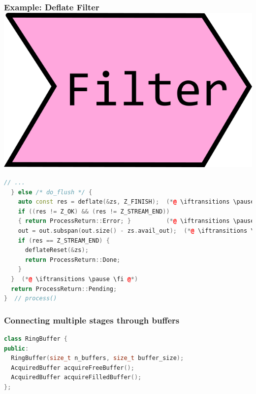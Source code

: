 \documentclass[aspectratio=169]{beamer}
\newif\iftransitions
\begin{document}
\begin{frame}[fragile]
  \frametitle{Example: Deflate Filter \hspace{233pt} \includegraphics[height=.1\textheight]{pipelinesgfx/filter.png}}
  
  \begin{lstlisting}[language={C++}]
  // ...
  } else /* do_flush */ {
    auto const res = deflate(&zs, Z_FINISH);  (*@ \iftransitions \pause \fi @*)
    if ((res != Z_OK) && (res != Z_STREAM_END))
    { return ProcessReturn::Error; }          (*@ \iftransitions \pause \fi @*)
    out = out.subspan(out.size() - zs.avail_out);  (*@ \iftransitions \pause \fi @*)
    if (res == Z_STREAM_END) {
      deflateReset(&zs);
      return ProcessReturn::Done;
    }
  }  (*@ \iftransitions \pause \fi @*)
  return ProcessReturn::Pending;
}  // process()
  \end{lstlisting}
\end{frame}

\begin{frame}[fragile]
  \frametitle{Connecting multiple stages through buffers}
  
  \iftransitions \pause \fi
  
  \begin{lstlisting}[language={C++}]
class RingBuffer {
public:
  RingBuffer(size_t n_buffers, size_t buffer_size);
  AcquiredBuffer acquireFreeBuffer();
  AcquiredBuffer acquireFilledBuffer();
};
  \end{lstlisting}
  
\end{frame}
\end{document}
